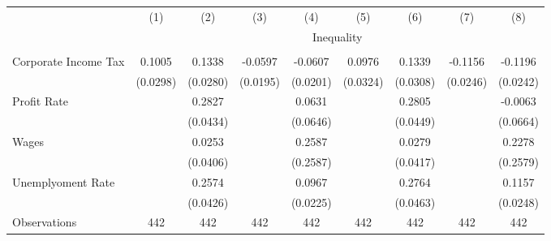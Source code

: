 \begin{tabular}{lcccccccc} \\ \hline 
                    &\multicolumn{1}{c}{(1)}         &\multicolumn{1}{c}{(2)}         &\multicolumn{1}{c}{(3)}         &\multicolumn{1}{c}{(4)}         &\multicolumn{1}{c}{(5)}         &\multicolumn{1}{c}{(6)}         &\multicolumn{1}{c}{(7)}         &\multicolumn{1}{c}{(8)}         \\
& \multicolumn{8}{c}{Inequality} \\ \hline &  &  &  &  &  &  &  &  &  \\
Corporate Income Tax&      0.1005\sym{***}&      0.1338\sym{***}&     -0.0597\sym{***}&     -0.0607\sym{***}&      0.0976\sym{***}&      0.1339\sym{***}&     -0.1156\sym{***}&     -0.1196\sym{***}\\
                    &    (0.0298)         &    (0.0280)         &    (0.0195)         &    (0.0201)         &    (0.0324)         &    (0.0308)         &    (0.0246)         &    (0.0242)         \\
\addlinespace
Profit Rate         &                     &      0.2827\sym{***}&                     &      0.0631         &                     &      0.2805\sym{***}&                     &     -0.0063         \\
                    &                     &    (0.0434)         &                     &    (0.0646)         &                     &    (0.0449)         &                     &    (0.0664)         \\
\addlinespace
Wages               &                     &      0.0253         &                     &      0.2587         &                     &      0.0279         &                     &      0.2278         \\
                    &                     &    (0.0406)         &                     &    (0.2587)         &                     &    (0.0417)         &                     &    (0.2579)         \\
\addlinespace
Unemplyoment Rate   &                     &      0.2574\sym{***}&                     &      0.0967\sym{***}&                     &      0.2764\sym{***}&                     &      0.1157\sym{***}\\
                    &                     &    (0.0426)         &                     &    (0.0225)         &                     &    (0.0463)         &                     &    (0.0248)         \\
\arrayrulecolor{black!10}\midrule
Observations        &         442         &         442         &         442         &         442         &         442         &         442         &         442         &         442         \\

\end{tabular}
